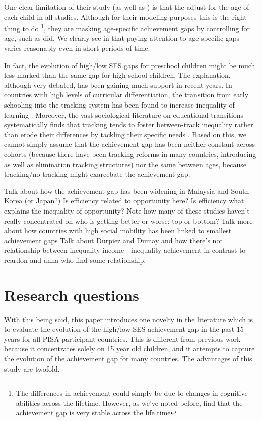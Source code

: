 \documentclass[11pt, a4paper]{article}\usepackage[]{graphicx}\usepackage[]{color}
\begin{document}
One clear limitation of their study (as well as \citet{reardon2011}) is that the adjust for the age of each child in all studies. Although for their modeling purposes this is the right thing to do \footnote{The differences in achievement could simply be due to changes in cognitive abilities across the lifetime. However, as we've noted before, \citet{bradbury2015} find that the achievement gap is very stable across the life time}, they are masking age-specific achievement gaps by controlling for age, such as \citet{reardon2011} did. We clearly see in \citet{reardon_portilla} that paying attention to age-specific gaps varies reasonably even in short periods of time.

In fact, the evolution of high/low SES gaps for preschool children might be much less marked than the same gap for high school children. The explanation, although very debated, has been gaining much support in recent years. In countries with high levels of curricular differentiation, the transition from early schooling into the tracking system has been found to increase inequality of learning \citep{hanushek_woesmann_tracking}. Moreover, the vast sociological literature on educational transitions systematically finds that tracking tends to foster between-track inequality rather than erode their differences by tackling their specific needs \citep{werfhorst_mijs}. Based on this, we cannot simply assume that the achievement gap has been neither constant across cohorts (because there have been tracking reforms in many countries, introducing as well as elimination tracking structures) nor the same between ages, because tracking/no tracking might exarcebate the achievement gap.

Talk about how the achievement gap has been widening in Malaysia and South Korea (or Japan?)
Is efficiency related to opportunity here? Is efficiency what explains the inequality of opportunity?
Note how many of these studies haven't really concentrated on who is getting better or worse: top or bottom?
Talk more about how countries with high social mobility has been linked to smallest achievement gaps
Talk about Durpiez and Dumay and how there's not relationship between inequality income - inequality achievement in contrast to reardon and anna who find some relationship.

\section{Research questions}

With this being said, this paper introduces one novelty in the literature which is to evaluate the evolution of the high/low SES achievement gap in the past 15 years for all PISA participant countries. This is different from previous work because it concentrates solely on 15 year old children, and it attempts to capture the evolution of the achievement gap for many countries. The advantages of this study are twofold.
\end{document}

